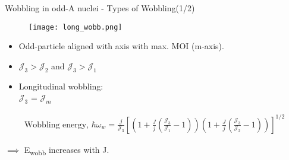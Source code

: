\documentclass [aspectratio=169]{beamer}
\begin{document}
\begin{frame}{Wobbling in odd-A nuclei - Types of Wobbling(1/2)}
\begin{multicols}{2}
\begin{figure}
\begin{center}
\texttt{[image: long\_wobb.png]}
\hspace{8pt}
\end{center}
\end{figure}
\begin{itemize}
\item{Odd-particle aligned with axis with max. MOI (m-axis).}
\item{$\mathcal{J}_{3} > \mathcal{J}_{2}$ and $\mathcal{J}_{3} > \mathcal{J}_{1}$}
\item{Longitudinal wobbling: \\ $\mathcal{J}_{3}$ = $\mathcal{J}_{m}$}
\end{itemize}
\end{multicols}
\begin{center}
\begin{align*}
\text{Wobbling energy, } \hbar \omega_{w} = \frac{j}{\mathcal{J}_{3}} \left[\left(1+ \frac{J}{j} \left( \frac{\mathcal{J}_{3}}{\mathcal{J}_{1}} -1 \right) \right) \left( 1+ \frac{J}{j} \left( \frac{\mathcal{J}_{3}}{\mathcal{J}_{2}} -1 \right)\right)\right]^{1/2}
\end{align*}
\end{center}
$\implies$ E\textsubscript{wobb} increases with J.
\begin{center}
\end{center}
\end{frame}
\end{document}

